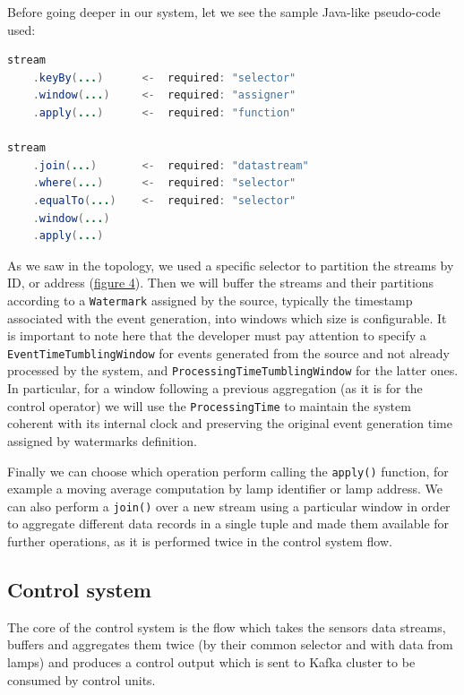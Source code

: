 Before going deeper in our system, let we see the sample Java-like pseudo-code used:
\begin{lstlisting}[language=Java,basicstyle=\tiny]
stream
    .keyBy(...)      <-  required: "selector"
    .window(...)     <-  required: "assigner"
    .apply(...)      <-  required: "function"

stream
    .join(...)       <-  required: "datastream"
    .where(...)      <-  required: "selector"
    .equalTo(...)    <-  required: "selector"
    .window(...)
    .apply(...)
\end{lstlisting}
As we saw in the topology, we used a specific selector to partition the streams by ID, or address (\hyperref[fig:ember_operation_flow]{figure 4}).  Then we will buffer the streams and their partitions according to a \texttt{Watermark} assigned by the source, typically the timestamp associated with the event generation, into windows which size is configurable. It is important to note here that the developer must pay attention to specify a \texttt{EventTimeTumblingWindow} for events generated from the source and not already processed by the system, and \texttt{ProcessingTimeTumblingWindow} for the latter ones. In particular, for a window following a previous aggregation (as it is for the control operator) we will use the \texttt{ProcessingTime} to maintain the system coherent with its internal clock and preserving the original event generation time assigned by watermarks definition.

Finally we can choose which operation perform calling the \texttt{apply()} function, for example a moving average computation by lamp identifier or lamp address. We can also perform a \texttt{join()} over a new stream using a particular window in order to aggregate different data records in a single tuple and made them available for further operations, as it is performed twice in the control system flow.

\subsection{Control system}
The core of the control system is the flow which takes the sensors data streams, buffers and aggregates them twice (by their common selector and with data from lamps) and produces a control output which is sent to Kafka cluster to be consumed by control units.

